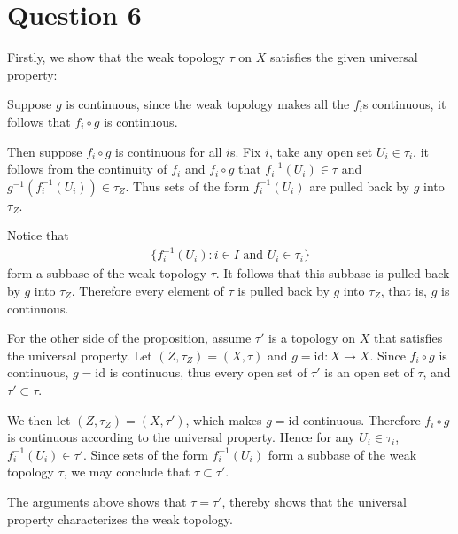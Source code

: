 \documentclass{article}
\begin{document}
\section*{Question 6}
Firstly, we show that the weak topology $\tau$ on $X$ satisfies the given universal property:

Suppose $g$ is continuous, since the weak topology makes all the $f_i$s continuous, it follows that $f_i\circ g$ is continuous.

Then suppose $f_i\circ g$ is continuous for all $i$s. Fix $i$, take any open set $U_i\in \tau_i$. it follows from the continuity of $f_i$ and $f_i\circ g$ that $f_i^{-1}(U_i)\in \tau $ and 
$g^{-1}(f^{-1}_i(U_i) )\in \tau_Z$. Thus sets of the form $f_i^{-1}(U_i)$ are pulled back by $g$ into $\tau_Z$.


Notice that
\begin{align*}
	\{f_{i}^{-1}(U_i):i\in I \mbox{ and } U_i \in \tau_i \}
\end{align*}
form a subbase of the weak topology $\tau$. It follows that this subbase is pulled back by $g$ into $\tau_Z$. Therefore every element of $\tau$ is pulled back by $g$ into $\tau_Z$, that is, $g$ is continuous.

\vspace{3ex}

For the other side of the proposition, assume $\tau'$ is a topology on $X$ that satisfies the universal property. Let $(Z,\tau_Z) =(X,\tau)$ and $g=$id$:X\to X$. Since $f_i\circ g$ is continuous, $g=$id is continuous, thus every open set of $\tau'$ is an open set of $\tau$, and $\tau' \subset \tau$.
\begin{center}
\end{center}

We then let $(Z,\tau_Z)=(X,\tau')$, which makes $g=$id continuous. Therefore $f_i\circ g$ is continuous according to the universal property. Hence for any $U_i \in \tau_i$, $f_i^{-1}(U_i) \in \tau'$. Since sets of the form $f_i^{-1}(U_i)$ form a subbase of the weak topology $\tau$, we may conclude that $\tau \subset \tau'$.

\begin{center}
\end{center}

The arguments above shows that $\tau=\tau'$, thereby shows that the universal property characterizes the weak topology.
\end{document}
